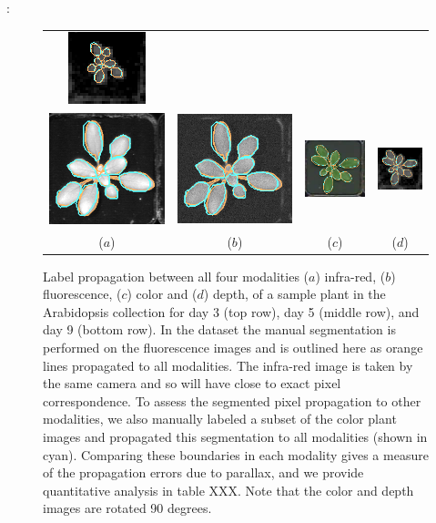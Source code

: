 \documentclass[11pt,letterpaper]{article}
\newenvironment{response}
{\noindent {\bf Response}: \color{black}}
{\color{black} \vspace{1.6em}}
\begin{document}
\begin{response}
\begin{figure}
\begin{centering}
\begin{tabular}{cccc}
\includegraphics[width=.18\textwidth]{../Figures/LabelAlignment/day_5_hour_23-seg_depth.png}\\
\includegraphics[width=.18\textwidth]{../Figures/LabelAlignment/day_9_hour_20-seg_ir.png}&
\includegraphics[width=.18\textwidth]{../Figures/LabelAlignment/day_9_hour_20-seg_fmp.png}&
\includegraphics[width=.18\textwidth]{../Figures/LabelAlignment/day_9_hour_20-seg_rgb.png}&
\includegraphics[width=.18\textwidth]{../Figures/LabelAlignment/day_9_hour_20-seg_depth.png}\\
($a$) & ($b$) & ($c$) & ($d$) \\
\end{tabular}
\caption{Label propagation between all four modalities ($a$) infra-red, ($b$) fluorescence, ($c$) color and ($d$) depth, of a sample plant in the Arabidopsis collection for day 3 (top row), day 5 (middle row), and day 9 (bottom row).  In the dataset the manual segmentation is performed on the fluorescence images and is outlined here as orange lines propagated to all modalities.  The infra-red image is taken by the same camera and so will have close to exact pixel correspondence.  To assess the segmented pixel propagation to other modalities, we also manually labeled a subset of the color plant images and propagated this segmentation to all modalities (shown in cyan).  Comparing these boundaries in each modality gives a measure of the propagation errors due to parallax, and we provide quantitative analysis in table XXX.  Note that the color and depth images are rotated 90 degrees.}
\label{fig:LabelAlignment}
\end{centering}
\end{figure}

\end{response}
\end{document}
